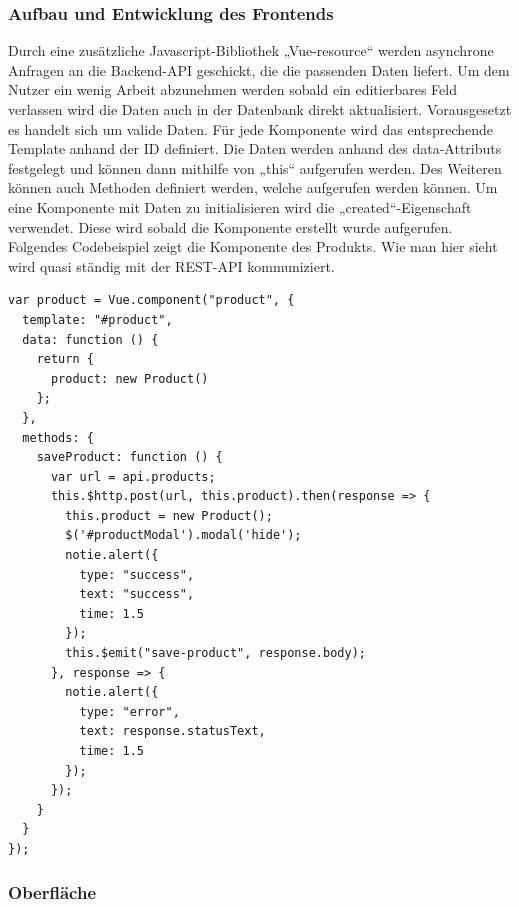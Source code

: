 \subsubsection{Aufbau und Entwicklung des Frontends}  
\label{sec:Aufbau und Entwicklung des Frontends-1}

Durch eine zusätzliche Javascript-Bibliothek „Vue-resource“ werden asynchrone Anfragen an die Backend-API geschickt, die die passenden Daten liefert. Um dem Nutzer ein wenig Arbeit abzunehmen werden sobald ein editierbares Feld verlassen wird die Daten auch in der Datenbank direkt aktualisiert. Vorausgesetzt es handelt sich um valide Daten.
Für jede Komponente wird das entsprechende Template anhand der ID definiert.
Die Daten werden anhand des data-Attributs festgelegt und können dann mithilfe von „this“ aufgerufen werden. 
Des Weiteren können auch Methoden definiert werden, welche aufgerufen werden können. Um eine Komponente mit Daten zu initialisieren wird die „created“-Eigenschaft verwendet. Diese wird sobald die Komponente erstellt wurde aufgerufen. Folgendes Codebeispiel zeigt die Komponente des Produkts. Wie man hier sieht wird quasi ständig mit der REST-API kommuniziert.

\begin{lstlisting}[frame=single]
var product = Vue.component("product", {
  template: "#product",
  data: function () {
    return {
      product: new Product()
    };
  },
  methods: {
    saveProduct: function () {
      var url = api.products;
      this.$http.post(url, this.product).then(response => {
        this.product = new Product();
        $('#productModal').modal('hide');
        notie.alert({
          type: "success",
          text: "success",
          time: 1.5
        });
        this.$emit("save-product", response.body);
      }, response => {
        notie.alert({
          type: "error",
          text: response.statusText,
          time: 1.5
        });
      });
    }
  }
});
\end{lstlisting}

\clearpage

\subsubsection{Oberfläche}  
\label{sec:Oberfläche-1}

